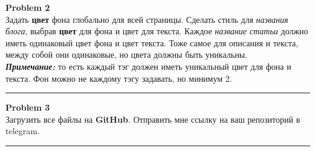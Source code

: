 \documentclass[a4paper, 11pt]{extarticle}
\newenvironment{problem}[2][Problem]
    { \begin{mdframed}[backgroundcolor=gray!20] \textbf{#1 #2} \\}
    {  \end{mdframed}}
\newenvironment{solution}
    {\textit{Solution:}}
    {}
\begin{document}

\begin{problem}{2}
Задать \textbf{цвет} фона глобально для всей страницы. Сделать стиль для \textit{названия блога}, выбрав \textbf{цвет} для фона и цвет для текста. Каждое \textit{название статьи} должно иметь одинаковый цвет фона и цвет текста. Тоже самое для описания и текста, между собой они одинаковые, но цвета должны быть уникальны.\\
\textit{\textbf{Примечание: }}то есть каждый тэг должен иметь уникальный цвет для фона и текста. Фон можно не каждому тэгу задавать, но минимум 2. 
\end{problem}
\noindent\rule{6.257in}{2.8pt}

\begin{problem}{3}
Загрузить все файлы на \textbf{GitHub}. Отправить мне ссылку на ваш репозиторий в telegram.
\end{problem}
\noindent\rule{6.257in}{2.8pt}


\end{document}
